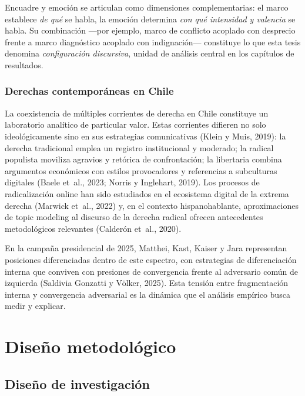 \documentclass[
  letterpaper,
  numbers=noendperiod,
  fontsize=11pt,
  DIV=12,
  titlepage=false]{scrreprt}
\begin{document}
Encuadre y emoción se articulan como dimensiones complementarias: el
marco establece \emph{de qué} se habla, la emoción determina \emph{con
qué intensidad y valencia} se habla. Su combinación ---por ejemplo,
marco de conflicto acoplado con desprecio frente a marco diagnóstico
acoplado con indignación--- constituye lo que esta tesis denomina
\emph{configuración discursiva}, unidad de análisis central en los
capítulos de resultados.

\subsection{Derechas contemporáneas en
Chile}\label{derechas-contemporuxe1neas-en-chile}

La coexistencia de múltiples corrientes de derecha en Chile constituye
un laboratorio analítico de particular valor. Estas corrientes difieren
no solo ideológicamente sino en sus estrategias comunicativas (Klein y
Muis, 2019): la derecha tradicional emplea un registro institucional y
moderado; la radical populista moviliza agravios y retórica de
confrontación; la libertaria combina argumentos económicos con estilos
provocadores y referencias a subculturas digitales (Baele et~al., 2023;
Norris y Inglehart, 2019). Los procesos de radicalización online han
sido estudiados en el ecosistema digital de la extrema derecha (Marwick
et~al., 2022) y, en el contexto hispanohablante, aproximaciones de topic
modeling al discurso de la derecha radical ofrecen antecedentes
metodológicos relevantes (Calderón et~al., 2020).

En la campaña presidencial de 2025, Matthei, Kast, Kaiser y Jara
representan posiciones diferenciadas dentro de este espectro, con
estrategias de diferenciación interna que conviven con presiones de
convergencia frente al adversario común de izquierda (Saldivia Gonzatti
y Völker, 2025). Esta tensión entre fragmentación interna y convergencia
adversarial es la dinámica que el análisis empírico busca medir y
explicar.


\chapter{Diseño metodológico}\label{diseuxf1o-metodoluxf3gico}

\section{Diseño de investigación}\label{sec-diseno}
\end{document}
